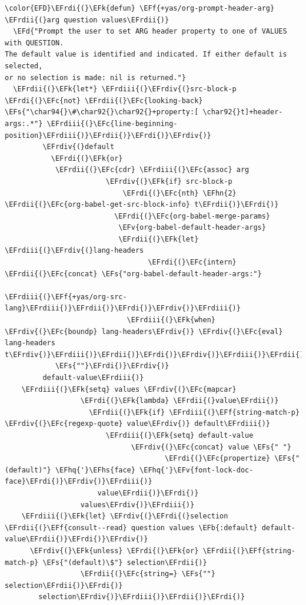 \documentclass{scrartcl}
\newcommand{\EFk}[1]{\textcolor{EFk}{#1}} %
\newcommand{\EFd}[1]{\textcolor{EFd}{\textit{#1}}} %
\newcommand{\EFs}[1]{\textcolor{EFs}{#1}} %
\newcommand{\EFb}[1]{\textcolor{EFb}{#1}} %
\newcommand{\EFc}[1]{\textcolor{EFc}{#1}} %
\newcommand{\EFv}[1]{\textcolor{EFv}{#1}} %
\newcommand{\EFf}[1]{\textcolor{EFf}{#1}} %
\newcommand{\EFhn}[1]{\textcolor{EFhn}{\textbf{#1}}} %
\newcommand{\EFhq}[1]{\textcolor{EFhq}{#1}} %
\newcommand{\EFhs}[1]{\textcolor{EFhs}{#1}} %
\newcommand{\EFrdi}[1]{\textcolor{EFrdi}{#1}} %
\newcommand{\EFrdii}[1]{\textcolor{EFrdii}{#1}} %
\newcommand{\EFrdiii}[1]{\textcolor{EFrdiii}{#1}} %
\newcommand{\EFrdiv}[1]{\textcolor{EFrdiv}{#1}} %
\begin{document}
\begin{Code}
\begin{Verbatim}[]
\color{EFD}\EFrdi{(}\EFk{defun} \EFf{+yas/org-prompt-header-arg} \EFrdii{(}arg question values\EFrdii{)}
  \EFd{"Prompt the user to set ARG header property to one of VALUES with QUESTION.
The default value is identified and indicated. If either default is selected,
or no selection is made: nil is returned."}
  \EFrdii{(}\EFk{let*} \EFrdiii{(}\EFrdiv{(}src-block-p \EFrdi{(}\EFc{not} \EFrdii{(}\EFc{looking-back} \EFs{"\char94{}\#\char92{}\char92{}+property:[ \char92{}t]+header-args:.*"} \EFrdiii{(}\EFc{line-beginning-position}\EFrdiii{)}\EFrdii{)}\EFrdi{)}\EFrdiv{)}
         \EFrdiv{(}default
           \EFrdi{(}\EFk{or}
            \EFrdii{(}\EFc{cdr} \EFrdiii{(}\EFc{assoc} arg
                        \EFrdiv{(}\EFk{if} src-block-p
                            \EFrdi{(}\EFc{nth} \EFhn{2} \EFrdii{(}\EFc{org-babel-get-src-block-info} t\EFrdii{)}\EFrdi{)}
                          \EFrdi{(}\EFc{org-babel-merge-params}
                           \EFv{org-babel-default-header-args}
                           \EFrdii{(}\EFk{let} \EFrdiii{(}\EFrdiv{(}lang-headers
                                  \EFrdi{(}\EFc{intern} \EFrdii{(}\EFc{concat} \EFs{"org-babel-default-header-args:"}
                                                  \EFrdiii{(}\EFf{+yas/org-src-lang}\EFrdiii{)}\EFrdii{)}\EFrdi{)}\EFrdiv{)}\EFrdiii{)}
                             \EFrdiii{(}\EFk{when} \EFrdiv{(}\EFc{boundp} lang-headers\EFrdiv{)} \EFrdiv{(}\EFc{eval} lang-headers t\EFrdiv{)}\EFrdiii{)}\EFrdii{)}\EFrdi{)}\EFrdiv{)}\EFrdiii{)}\EFrdii{)}
            \EFs{""}\EFrdi{)}\EFrdiv{)}
         default-value\EFrdiii{)}
    \EFrdiii{(}\EFk{setq} values \EFrdiv{(}\EFc{mapcar}
                  \EFrdi{(}\EFk{lambda} \EFrdii{(}value\EFrdii{)}
                    \EFrdii{(}\EFk{if} \EFrdiii{(}\EFf{string-match-p} \EFrdiv{(}\EFc{regexp-quote} value\EFrdiv{)} default\EFrdiii{)}
                        \EFrdiii{(}\EFk{setq} default-value
                              \EFrdiv{(}\EFc{concat} value \EFs{" "}
                                      \EFrdi{(}\EFc{propertize} \EFs{"(default)"} \EFhq{'}\EFhs{face} \EFhq{'}\EFv{font-lock-doc-face}\EFrdi{)}\EFrdiv{)}\EFrdiii{)}
                      value\EFrdii{)}\EFrdi{)}
                  values\EFrdiv{)}\EFrdiii{)}
    \EFrdiii{(}\EFk{let} \EFrdiv{(}\EFrdi{(}selection \EFrdii{(}\EFf{consult--read} question values \EFb{:default} default-value\EFrdii{)}\EFrdi{)}\EFrdiv{)}
      \EFrdiv{(}\EFk{unless} \EFrdi{(}\EFk{or} \EFrdii{(}\EFf{string-match-p} \EFs{"(default)\$"} selection\EFrdii{)}
                  \EFrdii{(}\EFc{string=} \EFs{""} selection\EFrdii{)}\EFrdi{)}
        selection\EFrdiv{)}\EFrdiii{)}\EFrdii{)}\EFrdi{)}
\end{Verbatim}
\end{Code}
\end{document}
